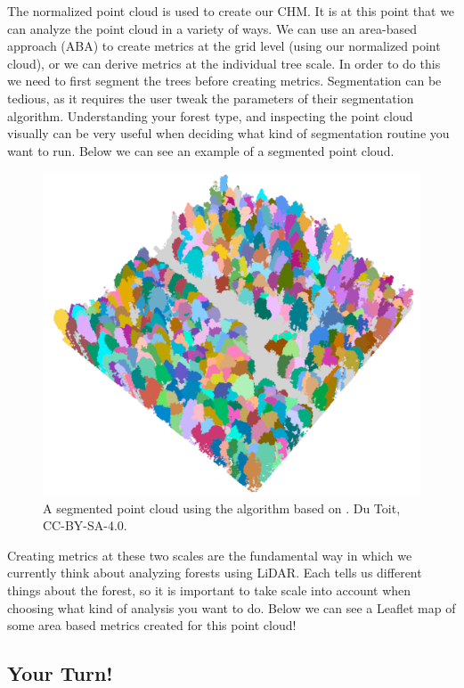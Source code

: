\documentclass[
]{book}
\begin{document}
The normalized point cloud is used to create our CHM. It is at this point that we can analyze the point cloud in a variety of ways. We can use an area-based approach (ABA) to create metrics at the grid level (using our normalized point cloud), or we can derive metrics at the individual tree scale. In order to do this we need to first segment the trees before creating metrics. Segmentation can be tedious, as it requires the user tweak the parameters of their segmentation algorithm. Understanding your forest type, and inspecting the point cloud visually can be very useful when deciding what kind of segmentation routine you want to run. Below we can see an example of a segmented point cloud.



\begin{figure}
\includegraphics[width=0.75\linewidth]{images/15-las-segmented} \caption{A segmented point cloud using the algorithm based on \citep{dalponte_tree-centric_2016}. Du Toit, CC-BY-SA-4.0.}\label{fig:15-las-segmented}
\end{figure}

Creating metrics at these two scales are the fundamental way in which we currently think about analyzing forests using LiDAR. Each tells us different things about the forest, so it is important to take scale into account when choosing what kind of analysis you want to do. Below we can see a Leaflet map of some area based metrics created for this point cloud!

\subsection*{Your Turn!}\label{your-turn-6}
\end{document}
